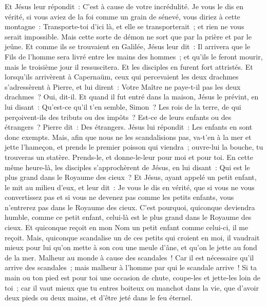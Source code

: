 \begin{multicols}{2}
Et Jésus leur répondit~: C'est à cause de votre incrédulité. Je vous le dis en vérité, si vous aviez de la foi comme un grain de sénevé, vous diriez à cette montagne~: Transporte-toi d'ici là, et elle se transporterait~; et rien ne vous serait impossible.
Mais cette sorte de démon ne sort que par la prière et par le jeûne.
Et comme ils se trouvaient en Galilée, Jésus leur dit~: Il arrivera que le Fils de l'homme sera livré entre les mains des hommes~;
et qu'ils le feront mourir, mais le troisième jour il ressuscitera. Et les disciples en furent fort attristés.
Et lorsqu'ils arrivèrent à Capernaüm, ceux qui percevaient les deux drachmes s'adressèrent à Pierre, et lui dirent~: Votre Maître ne paye-t-il pas les deux drachmes~?
Oui, dit-il. Et quand il fut entré dans la maison, Jésus le prévint, en lui disant~: Qu'est-ce qu'il t'en semble, Simon~? Les rois de la terre, de qui perçoivent-ils des tributs ou des impôts~? Est-ce de leurs enfants ou des étrangers~?
Pierre dit~: Des étrangers. Jésus lui répondit~: Les enfants en sont donc exempts.
Mais, afin que nous ne les scandalisions pas, va-t'en à la mer et jette l'hameçon, et prends le premier poisson qui viendra~; ouvre-lui la bouche, tu trouveras un statère. Prends-le, et donne-le-leur pour moi et pour toi.
\VerseOne{}En cette même heure-là, les disciples s'approchèrent de Jésus, en lui disant~: Qui est le plus grand dans le Royaume des cieux~?
Et Jésus, ayant appelé un petit enfant, le mit au milieu d'eux,
et leur dit~: Je vous le dis en vérité, que si vous ne vous convertissez pas et si vous ne devenez pas comme les petits enfants, vous n'entrerez pas dans le Royaume des cieux.
C'est pourquoi, quiconque deviendra humble, comme ce petit enfant, celui-là est le plus grand dans le Royaume des cieux.
Et quiconque reçoit en mon Nom un petit enfant comme celui-ci, il me reçoit.
Mais, quiconque scandalise un de ces petits qui croient en moi, il vaudrait mieux pour lui qu'on mette à son cou une meule d'âne, et qu'on le jette au fond de la mer.
Malheur au monde à cause des scandales~! Car il est nécessaire qu'il arrive des scandales~; mais malheur à l'homme par qui le scandale arrive~!
Si ta main ou ton pied est pour toi une occasion de chute, coupe-les et jette-les loin de toi~; car il vaut mieux que tu entres boiteux ou manchot dans la vie, que d'avoir deux pieds ou deux mains, et d'être jeté dans le feu éternel.

\end{multicols}
